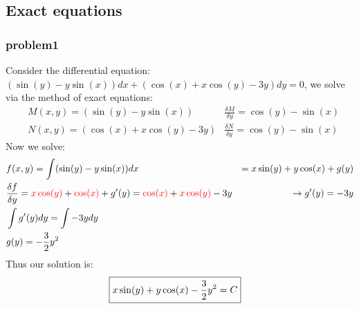 \documentclass{article}
\begin{document}
\pagestyle{fancy}

\setcounter{section}{2}
\setcounter{subsection}{3}
\setcounter{subsubsection}{0}

\subsection{Exact equations}
\subsubsection{problem1}


Consider the differential equation: $(\sin(y) - y\sin(x))dx + (\cos(x) + x\cos(y) - 3y)dy = 0$, we solve via the method of exact equations:
\begin{align*}
    & M(x,y) = (\sin(y) - y\sin(x)) & \frac{\delta M}{\delta y} = \cos(y) - \sin(x)\\
    & N(x,y) = (\cos(x) + x\cos(y) - 3y) & \frac{\delta N}{\delta y} = \cos(y) - \sin(x)
\end{align*}
Now we solve:
\begin{align}
    & f(x,y) = \int(\sin(y) - y\sin(x))dx & = x\sin(y) + y\cos(x) + g(y)\\
     &\frac{\delta f}{\delta y} = \textcolor{red}{x\cos(y)} + \textcolor{red}{\cos(x)} + g'(y) =
     \textcolor{red}{\cos(x)} + \textcolor{red}{x\cos(y)} - 3y & \rightarrow  g'(y) = -3y\\
     & \int g'(y)dy = \int -3ydy\\
     & g(y) = -\frac{3}{2}y^2
\end{align}
Thus our solution is:
\begin{align}
     \Aboxed{x\sin(y) + y\cos(x) - \frac{3}{2}y^2 = C}
\end{align}


\setcounter{equation}{0}
\end{document}
